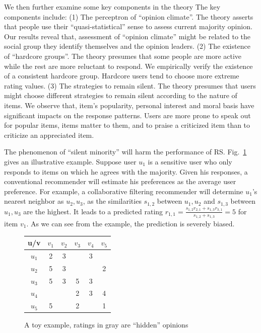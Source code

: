 \documentclass{sig-alternate}
\begin{document}
We then further examine some key components in the theory  The key components include: (1) The perceptron of ``opinion climate''. The theory asserts that people use their ``quasi-statistical'' sense to assess current majority opinion. Our results reveal that, assessment of ``opinion climate'' might be related to the social group they identify themselves and the opinion leaders. (2) The existence of ``hardcore groups''. The theory presumes that some people are more active while the rest are more reluctant to respond. We empirically verify the existence of a consistent hardcore group. Hardcore users tend to choose more extreme rating values. (3) The strategies to remain silent. The theory presumes that users might choose different strategies to remain silent according to the nature of items. We observe that, item's popularity, personal interest and moral basis have significant impacts on the response patterns. Users are more prone to speak out for popular items, items matter to them, and to praise a criticized item than to criticize an appreciated item.


The phenomenon of ``silent minority'' will harm the performance of RS. Fig.~\ref{fig:example} gives an illustrative example. Suppose user $u_1$ is a sensitive user who only responds to items on which he agrees with the majority. Given his responses, a conventional recommender will estimate his preferences as the average user preference. For example, a collaborative filtering recommender will determine $u_1$'s nearest neighbor as $u_2,u_3$, as the similarities    $s_{1,2}$ between $u_1,u_2$ and $s_{1,3}$ between $u_1,u_3$ are the highest. It leads to a predicted rating $r_{1,1}=\frac{s_{1,2} r_{2,1}+s_{1,3} r_{3,1}}{s_{1,2}+s_{1,3} }=5$ for item $v_1$. As we can see from the example, the prediction is severely biased.

\begin{figure}\label{fig:example}
\centering
\tiny
\begin{tabular}{|c|c|c|c|c|c|}
\hline
u/v & $v_1$ & $v_2$ & $v_3$ & $v_4$ & $v_5$ \\\hline\hline
 $u_1$ & \color{mygray}2 & 3 & & 3 &  \\\hline
 $u_2$ & 5 & 3 & &  &2 \\\hline
 $u_3$ & 5 & 3 &5 & 3 & \\\hline
 $u_4$ &  &  &2 & 3 & 4 \\\hline
 $u_5$ & 5 &  &2 &  &  1\\\hline
\end{tabular}
\caption{A toy example, ratings in gray are ``hidden'' opinions}
\end{figure}
\end{document}
